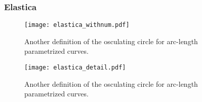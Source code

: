 \subsubsection{Elastica}

\begin{figure}[H]
\begin{center}
\texttt{[image: elastica\_withnum.pdf]}
\caption{Another definition of the osculating circle for arc-length parametrized curves.}
\label{fig:1_1}
\end{center}
\end{figure}

\begin{figure}[H]
\begin{center}
\texttt{[image: elastica\_detail.pdf]}
\caption{Another definition of the osculating circle for arc-length parametrized curves.}
\label{fig:1_1}
\end{center}
\end{figure}

